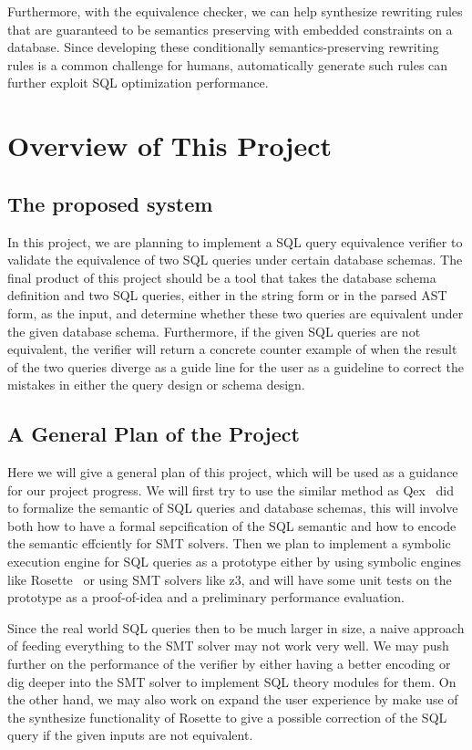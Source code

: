 \documentclass{article}
\begin{document}
Furthermore, with the equivalence checker, we can help synthesize rewriting rules that are guaranteed to be semantics preserving with embedded constraints on a database. Since developing these conditionally semantics-preserving rewriting rules is a common challenge for humans, automatically generate such rules can further exploit SQL optimization performance.

\section{Overview of This Project}
\subsection{The proposed system}
In this project, we are planning to implement a SQL query equivalence verifier
to validate the equivalence of two SQL queries under certain database schemas.
The final product of this project should be a tool that takes the database schema
definition and two SQL queries, either in the string form or in the parsed AST form, 
as the input, and determine whether these two queries are equivalent under the given
database schema. 
Furthermore, if the given SQL queries are not equivalent, the verifier will return a concrete
counter example of when the result of the two queries diverge as a guide line for the user
as a guideline to correct the mistakes in either the query design or schema design.

\subsection{A General Plan of the Project}
Here we will give a general plan of this project, which will be used as a guidance for our
project progress.
We will first try to use the similar method as Qex~\cite{veanes2010qex,veanes2009symbolic} did
to formalize the semantic of SQL queries and database schemas, this will involve both how to 
have a formal sepcification of the SQL semantic and how to encode the semantic effciently for
SMT solvers.
Then we plan to implement a symbolic execution engine for SQL queries as a prototype 
either by using symbolic engines like Rosette~\cite{torlak2014lightweight} 
or using SMT solvers like z3, and will have some unit tests on the prototype as
a proof-of-idea and a preliminary performance evaluation.

Since the real world SQL queries then to be much larger in size, a naive approach of feeding everything
to the SMT solver may not work very well.
We may push further on the performance of the verifier by either having a better encoding or dig deeper
into the SMT solver to implement SQL theory modules for them.
On the other hand, we may also work on expand the user experience by make use of the synthesize functionality
of Rosette to give a possible correction of the SQL query if the given inputs are not equivalent.
\end{document}
